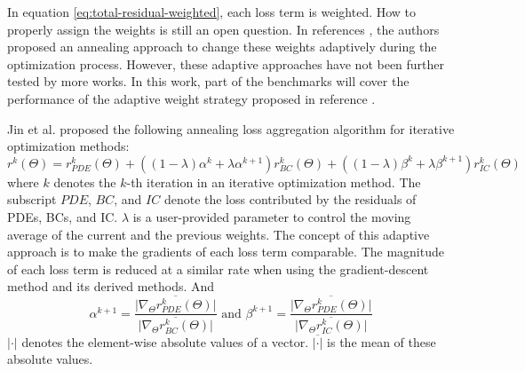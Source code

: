 In equation \eqref{eq:total-residual-weighted}, each loss term is weighted.
How to properly assign the weights is still an open question.
In references \cite{jin_nsfnets_2020,wang_understanding_2021}, the authors proposed an annealing approach to change these weights adaptively during the optimization process.
However, these adaptive approaches have not been further tested by more works.
In this work, part of the benchmarks will cover the performance of the adaptive weight strategy proposed in reference \cite{jin_nsfnets_2020}.

Jin et al. \cite{jin_nsfnets_2020} proposed the following annealing loss aggregation algorithm for iterative optimization methods:
\begin{equation}
    r^k(\Theta) = r_{PDE}^k(\Theta) + 
        \left(\left(1-\lambda\right)\alpha^k + \lambda\alpha^{k+1}\right)r_{BC}^k(\Theta) + 
        \left(\left(1-\lambda\right)\beta^k + \lambda\beta^{k+1}\right)r_{IC}^k(\Theta)
\end{equation}
where $k$ denotes the $k$-th iteration in an iterative optimization method.
The subscript $PDE$, $BC$, and $IC$ denote the loss contributed by the residuals of PDEs, BCs, and IC.
$\lambda$ is a user-provided parameter to control the moving average of the current and the previous weights.
The concept of this adaptive approach is to make the gradients of each loss term comparable.
The magnitude of each loss term is reduced at a similar rate when using the gradient-descent method and its derived methods.
And
\begin{equation}
    \alpha^{k+1} = \frac{\overline{\lvert\nabla_\Theta r_{PDE}^k(\Theta)\rvert}}{\overline{\lvert\nabla_\Theta r_{BC}^k(\Theta)\rvert}}
    \text{\ \ \ \ and\ \ \ \ }
    \beta^{k+1} = \frac{\overline{\lvert\nabla_\Theta r_{PDE}^k(\Theta)\rvert}}{\overline{\lvert\nabla_\Theta r_{IC}^k(\Theta)\rvert}}
\end{equation}
$\lvert\cdot\rvert$ denotes the element-wise absolute values of a vector.
$\overline{\lvert\cdot\rvert}$ is the mean of these absolute values.

